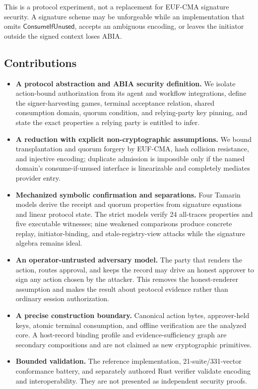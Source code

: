 \documentclass[11pt]{article}
\begin{document}
This is a protocol experiment, not a replacement for EUF-CMA signature
security. A signature scheme may be unforgeable while an implementation that
omits $\mathsf{ConsumeIfUnused}$, accepts an ambiguous encoding, or leaves the
initiator outside the signed context loses ABIA.

\subsection{Contributions}

\begin{itemize}[leftmargin=*]
\item \textbf{A protocol abstraction and ABIA security definition.} We isolate
action-bound authorization from its agent and workflow integrations, define the
signer-harvesting games, terminal acceptance relation, shared consumption domain,
quorum condition, and relying-party key pinning, and state the exact properties
a relying party is entitled to infer.
\item \textbf{A reduction with explicit non-cryptographic assumptions.} We
bound transplantation and quorum forgery by EUF-CMA, hash collision resistance,
and injective encoding; duplicate admission is impossible only if the named
domain's consume-if-unused interface is linearizable and completely mediates
provider entry.
\item \textbf{Mechanized symbolic confirmation and separations.} Four Tamarin
models derive the receipt and quorum properties from signature equations and
linear protocol state. The strict models verify 24 all-traces properties and
five executable witnesses; nine weakened comparisons produce concrete replay,
initiator-binding, and stale-registry-view attacks while the signature algebra
remains ideal.
\item \textbf{An operator-untrusted adversary model.} The party that renders the
action, routes approval, and keeps the record may drive an honest approver to
sign any action chosen by the attacker. This removes the honest-renderer
assumption and makes the result about protocol evidence rather than ordinary
session authorization.
\item \textbf{A precise construction boundary.} Canonical action bytes,
approver-held keys, atomic terminal consumption, and offline verification are the
analyzed core. A host-record binding profile and evidence-sufficiency graph are
secondary compositions and are not claimed as new cryptographic primitives.
\item \textbf{Bounded validation.} The reference implementation,
21-suite/331-vector conformance battery, and separately authored Rust verifier
validate encoding and interoperability. They are not presented as independent
security proofs.
\end{itemize}
\end{document}
